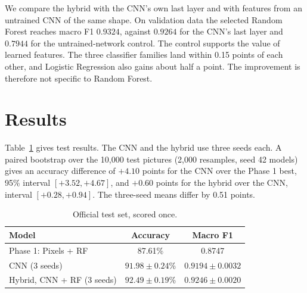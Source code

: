 \documentclass[conference]{IEEEtran}
\begin{document}
We compare the hybrid with the CNN's own last layer and with features from an untrained CNN of the same shape. On validation data the selected Random Forest reaches macro F1 $0.9324$, against $0.9264$ for the CNN's last layer and $0.7944$ for the untrained-network control. The control supports the value of learned features. The three classifier families land within 0.15 points of each other, and Logistic Regression also gains about half a point. The improvement is therefore not specific to Random Forest.

\section{Results}
Table~\ref{tab:test} gives test results. The CNN and the hybrid use three seeds each. A paired bootstrap over the 10,000 test pictures (2,000 resamples, seed 42 models) gives an accuracy difference of $+4.10$ points for the CNN over the Phase 1 best, 95\% interval $[+3.52,+4.67]$, and $+0.60$ points for the hybrid over the CNN, interval $[+0.28,+0.94]$. The three-seed means differ by 0.51 points.
\begin{table}[t]\centering\caption{Official test set, scored once.}\label{tab:test}
\begin{tabular}{lcc}\toprule
Model & Accuracy & Macro F1\\\midrule
Phase 1: Pixels + RF & 87.61\% & 0.8747\\
CNN (3 seeds) & $91.98\pm0.24$\% & $0.9194\pm0.0032$\\
Hybrid, CNN + RF (3 seeds) & $92.49\pm0.19$\% & $0.9246\pm0.0020$\\\bottomrule\end{tabular}\end{table}
\end{document}
